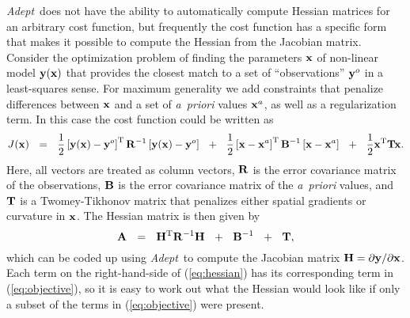 \documentclass[a4,oneside]{book}
\def\x{\ensuremath{{\bf x}}}
\def\y{\ensuremath{{\bf y}}}
\def\Adept{\emph{Adept}}
\begin{document}
\Adept\ does not have the ability to automatically compute Hessian
matrices for an arbitrary cost function, but frequently the
cost function has a specific form that makes it possible to
compute the Hessian from the Jacobian matrix.  Consider the
optimization problem of finding the parameters $\x$ of non-linear
model $\y(\x)$ that provides the closest match to a set of
``observations'' $\y^o$ in a least-squares sense.  For maximum
generality we add constraints that penalize differences between $\x$
and a set of \emph{a~priori} values $\x^a$, as well as a
regularization term.  In this case the cost function could be
written as \def\myspace{~~}
\begin{equation}
J(\x) \myspace =\myspace \frac12\left[\y(\x)-\y^o\right]^\mathrm{T}{\bf
  R}^{-1}\left[\y(\x)-\y^o\right]
\myspace+\myspace\frac12\left[\x-\x^a\right]^\mathrm{T}{\bf
  B}^{-1}\left[\x-\x^a\right]
\myspace+\myspace\frac12\x^\mathrm{T}{\bf T}\x.\nonumber
\label{eq:objective}
\end{equation}
Here, all vectors are treated as column vectors, ${\bf R}$ is the
error covariance matrix of the observations, ${\bf B}$ is the error
covariance matrix of the \emph{a~priori} values, and ${\bf T}$ is a
Twomey-Tikhonov matrix that penalizes either spatial gradients or
curvature in $\x$.  The Hessian matrix is then given by
\begin{equation}
{\bf A} \myspace=\myspace {\bf H}^\mathrm{T}{\bf
  R}^{-1}{\bf H}\nonumber
\myspace+\myspace {\bf B}^{-1} \myspace+\myspace {\bf T},
\label{eq:hessian}
\end{equation}
which can be coded up using \Adept\ to compute the Jacobian matrix
${\bf H}=\partial\y/\partial\x$. Each term on the right-hand-side of
(\ref{eq:hessian}) has its corresponding term in (\ref{eq:objective}),
so it is easy to work out what the Hessian would look like if only a
subset of the terms in (\ref{eq:objective}) were present.
\end{document}
